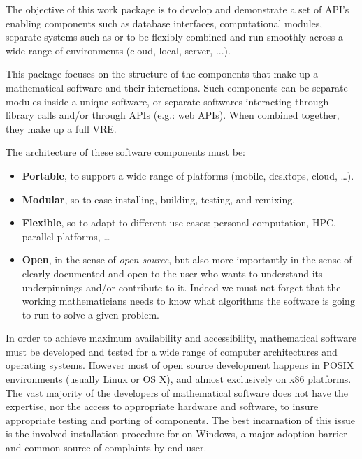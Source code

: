 \begin{workpackage}[id=component-architecture,wphases=3-24!.5,
  title=Component Architecture,lead=UV,
  PSRM=24,UVRM=1,SARM=1, USHRM=4]

  \begin{wpobjectives}
    The objective of this work package is to develop and demonstrate a
    set of API's enabling components such as database interfaces,
    computational modules, separate systems such as \GAP or \Sage to
    be flexibly combined and run smoothly across a wide range of
    environments (cloud, local, server, ...).
  \end{wpobjectives}

  \begin{wpdescription}
    This package focuses on the structure of the components that make
    up a mathematical software and their interactions. Such components
    can be separate modules inside a unique software, or separate
    softwares interacting through library calls and/or through APIs
    (e.g.: web APIs). When combined together, they make up a full VRE.

    The architecture of these software components must be:
    \begin{itemize}
    \item \textbf{Portable}, to support a wide range of platforms
      (mobile, desktops, cloud, \dots).
    \item \textbf{Modular}, so to ease installing, building, testing,
      and remixing.
    \item \textbf{Flexible}, so to adapt to different use cases:
      personal computation, HPC, parallel platforms, \dots
    \item \textbf{Open}, in the sense of \emph{open source}, but also
      more importantly in the sense of clearly documented and open to
      the user who wants to understand its underpinnings and/or
      contribute to it. Indeed we must not forget that the working
      mathematicians needs to know what algorithms the software is
      going to run to solve a given problem.
    \end{itemize}
  \end{wpdescription}

  \begin{tasklist}
  \begin{task}[id=portability,title=Portability]
    In order to achieve maximum availability and accessibility,
    mathematical software must be developed and tested for a wide range
    of computer architectures and operating systems.  However most of
    open source development happens in POSIX environments (usually
    Linux or OS X), and almost exclusively on x86 platforms.  The vast
    majority of the developers of mathematical software does not have
    the expertise, nor the access to appropriate hardware and software, to insure
    appropriate testing and porting of components.  The best
    incarnation of this issue is the involved installation procedure
    for \Sage on Windows, a major adoption barrier and common source of
    complaints by end-user.


\end{task}
\end{tasklist}
\end{workpackage}
